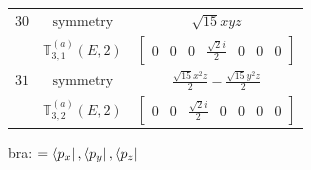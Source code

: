 \documentclass[fleqn,8pt,landscape]{jsarticle}
\begin{document}
\begin{longtable}{ccc}
$ 30 $ & $ \text{symmetry} $ & $ \sqrt{15} x y z $ \\
$  $ & $ \mathbb{T}_{3,1}^{(a)}(E,2) $ & $ \begin{bmatrix} 0 & 0 & 0 & \frac{\sqrt{2} i}{2} & 0 & 0 & 0 \end{bmatrix} $ \\ \hline
$ 31 $ & $ \text{symmetry} $ & $ \frac{\sqrt{15} x^{2} z}{2} - \frac{\sqrt{15} y^{2} z}{2} $ \\
$  $ & $ \mathbb{T}_{3,2}^{(a)}(E,2) $ & $ \begin{bmatrix} 0 & 0 & \frac{\sqrt{2} i}{2} & 0 & 0 & 0 & 0 \end{bmatrix} $ \\ \hline
\end{longtable}
bra: $=\bra{p_{x}}, \bra{p_{y}}, \bra{p_{z}}$
\end{document}
